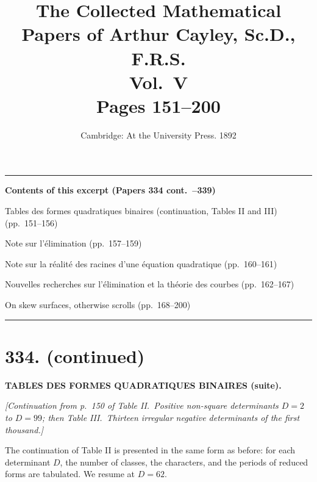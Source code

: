 \documentclass[11pt,a4paper]{article}
\title{\textbf{The Collected Mathematical Papers of Arthur Cayley, Sc.D., F.R.S.}\\[6pt]
\Large Vol.\ V\\[12pt]
\large Pages 151--200}
\author{}
\date{Cambridge: At the University Press. 1892}
\begin{document}
\maketitle
\thispagestyle{empty}

\vspace{2em}
\noindent\rule{\textwidth}{0.4pt}
\vspace{1em}

\begin{center}
\textbf{Contents of this excerpt (Papers 334 cont.\ --339)}
\end{center}

\begin{enumerate}[label={[\arabic*]}]
\setcounter{enumi}{333}
\item Tables des formes quadratiques binaires (continuation, Tables II and III) (pp.\ 151--156)
\item Note sur l'\'{e}limination (pp.\ 157--159)
\item Note sur la r\'{e}alit\'{e} des racines d'une \'{e}quation quadratique (pp.\ 160--161)
\item Nouvelles recherches sur l'\'{e}limination et la th\'{e}orie des courbes (pp.\ 162--167)
\item On skew surfaces, otherwise scrolls (pp.\ 168--200)
\end{enumerate}

\vspace{1em}
\noindent\rule{\textwidth}{0.4pt}
\vspace{2em}

\section*{334. (continued)}

\begin{center}
\textbf{TABLES DES FORMES QUADRATIQUES BINAIRES (suite).}
\end{center}

\bigskip

\noindent\textit{[Continuation from p.\ 150 of Table II.\ Positive non-square determinants $D=2$ to $D=99$; then Table III.\ Thirteen irregular negative determinants of the first thousand.]}

\bigskip

\noindent The continuation of Table II is presented in the same form as before: for each determinant $D$, the number of classes, the characters, and the periods of reduced forms are tabulated. We resume at $D=62$.
\end{document}
